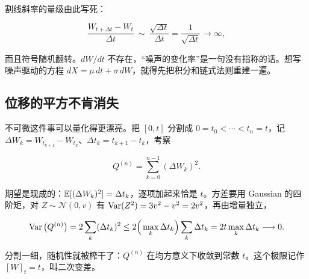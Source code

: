 割线斜率的量级由此写死：

\[
\frac{W_{t+\Delta t}-W_t}{\Delta t}\ \sim\ \frac{\sqrt{\Delta t}}{\Delta t}=\frac{1}{\sqrt{\Delta t}}\longrightarrow\infty,
\]

而且符号随机翻转。\(dW/dt\) 不存在，``噪声的变化率''是一句没有指称的话。想写噪声驱动的方程 \(dX=\mu\,dt+\sigma\,dW\)，就得先把积分和链式法则重建一遍。

\subsection{位移的平方不肯消失}

不可微这件事可以量化得更漂亮。把 \([0,t]\) 分割成 \(0=t_0<\cdots<t_n=t\)，记 \(\Delta W_k=W_{t_{k+1}}-W_{t_k}\)、\(\Delta t_k=t_{k+1}-t_k\)，考察

\[
Q^{(n)}=\sum_{k=0}^{n-1}(\Delta W_k)^2 .
\]

期望是现成的：\(\mathbb{E}[(\Delta W_k)^2]=\Delta t_k\)，逐项加起来恰是 \(t\)。方差要用 Gaussian 的四阶矩，对 \(Z\sim\mathcal N(0,v)\) 有 \(\operatorname{Var}(Z^2)=3v^2-v^2=2v^2\)，再由增量独立，

\[
\operatorname{Var}\big(Q^{(n)}\big)=2\sum_k(\Delta t_k)^2\le 2\Big(\max_k\Delta t_k\Big)\sum_k\Delta t_k
=2t\max_k\Delta t_k\longrightarrow 0 .
\]

分割一细，随机性就被榨干了：\(Q^{(n)}\) 在均方意义下收敛到常数 \(t\)。这个极限记作 \([W]_t=t\)，叫二次变差。

